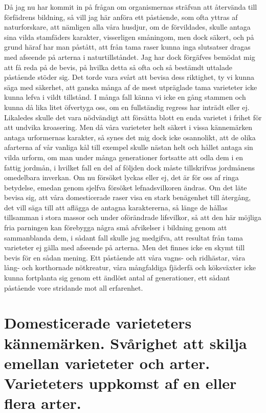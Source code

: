 Då jag nu har kommit in på frågan om organismernas sträfvan att återvända till förfädrens bildning, så vill jag här anföra ett påstående, som ofta yttras af naturforskare, att nämligen alla våra husdjur, om de förvildades, skulle antaga sina vilda stamfäders karakter, visserligen småningom, men dock säkert, och på grund häraf har man påstått, att från tama raser kunna inga slutsatser dragas med afseende på arterna i naturtillståndet. Jag har dock förgäfves bemödat mig att få reda på de bevis, på hvilka detta så ofta och så bestämdt uttalade påstående stöder sig. Det torde vara svårt att bevisa dess riktighet, ty vi kunna säga med säkerhet, att ganska många af de mest utpräglade tama varieteter icke kunna lefva i vildt tillstånd. I många fall känna vi icke en gång stammen och kunna då lika litet öfvertyga oss, om en fullständig regress har inträdt eller ej. Likaledes skulle det vara nödvändigt att försätta blott en enda varietet i frihet för att undvika kroasering. Men då våra varieteter helt säkert i vissa kännemärken antaga urformernas karakter, så synes det mig dock icke osannolikt, att de olika afarterna af vår vanliga kål till exempel skulle nästan helt och hållet antaga sin vilda urform, om man under många generationer fortsatte att odla dem i en fattig jordmån, i hvilket fall en del af följden dock måste tillskrifvas jordmånens omedelbara inverkan. Om nu försöket lyckas eller ej, det är för oss af ringa betydelse, emedan genom sjelfva försöket lefnadsvilkoren ändras. Om det läte bevisa sig, att våra domesticerade raser visa en stark benägenhet till återgång, det vill säga till att aflägga de antagna karaktererna, så länge de hållas tillsamman i stora massor och under oförändrade lifsvilkor, så att den här möjliga fria parningen kan förebygga några små afvikelser i bildning genom att sammanblanda dem, i sådant fall skulle jag medgifva, att resultat från tama varieteter ej gälla med afseende på arterna. Men det finnes icke en skymt till bevis för en sådan mening. Ett påstående att våra vagns- och ridhästar, våra lång- och korthornade nötkreatur, våra mångfaldiga fjäderfä och köksväxter icke kunna fortplanta sig genom ett ändlöst antal af generationer, ett sådant påstående vore stridande mot all erfarenhet.



\section[Domensticerade varieteter]{Domesticerade varieteters kännemärken. Svårighet
att skilja emellan varieteter och arter. Varieteters
uppkomst af en eller flera arter.}

